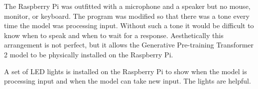 The Raspberry Pi was outfitted with a microphone and a speaker but no mouse, monitor, or keyboard. The program was modified so that there was a tone every time the model was processing input. Without such a tone it would be difficult to know when to speak and when to wait for a response. Aesthetically this arrangement is not perfect, but it allows the Generative Pre-training Transformer 2 model to be physically installed on the Raspberry Pi.

A set of LED lights is installed on the Raspberry Pi to show when the model is processing input and when the model can take new input. The lights are helpful.

